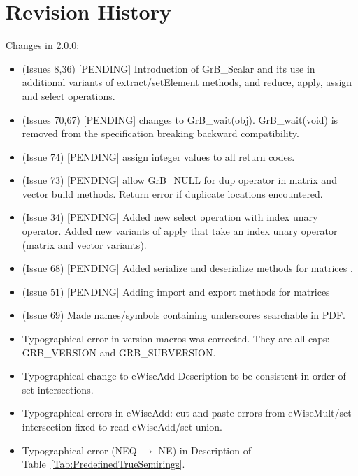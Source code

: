 \chapter{Revision History}
\label{Chp:RevHistory}

Changes in 2.0.0:
\begin{itemize}
\item (Issues 8,36) [PENDING] Introduction of {\sf GrB\_Scalar} and its use in additional variants of extract/setElement methods, and reduce, apply, assign and select operations.
\item (Issues 70,67) [PENDING] changes to {\sf GrB\_wait(obj)}. {\sf GrB\_wait(void)} is removed from the specification breaking backward compatibility.
\item (Issue 74) [PENDING] assign integer values to all return codes.
\item (Issue 73) [PENDING] allow {\sf GrB\_NULL} for dup operator in matrix and vector {\sf build} methods.  Return error if duplicate locations encountered.
\item (Issue 34) [PENDING] Added new select operation with index unary operator. Added new variants of apply that take an index unary operator (matrix and vector variants).
\item (Issue 68) [PENDING] Added serialize and deserialize methods for matrices .
\item (Issue 51) [PENDING] Adding import and export methods for matrices
\item (Issue 69) Made names/symbols containing underscores searchable in PDF.
\item Typographical error in version macros was corrected.  They are all caps: {\sf GRB\_VERSION} and {\sf GRB\_SUBVERSION}.
\item Typographical change to eWiseAdd Description to be consistent in order of set intersections.
\item Typographical errors in eWiseAdd: cut-and-paste errors from eWiseMult/set intersection fixed to read eWiseAdd/set union.
\item Typographical error ({\sf NEQ} $\rightarrow$ {\sf NE}) in Description of Table~\ref{Tab:PredefinedTrueSemirings}.
\end{itemize}


